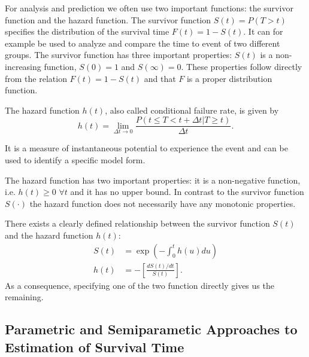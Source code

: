 \documentclass[12pt, a4paper]{article}
\theoremstyle{definition}
\theoremstyle{plain}
\numberwithin{equation}{section}
\numberwithin{figure}{section}
\numberwithin{table}{section}
\begin{document}
	
	For analysis and prediction we often use two important functions: the survivor function and the hazard function.
	The survivor function $S(t) = P(T > t)$ specifies the distribution of the survival time $F(t) = 1 - S(t)$.
	It can for example be used to analyze and compare the time to event of two different groups.
	The survivor function has three important properties: $S(t)$ is a non-increasing function, $S(0)=1$ and $S(\infty)=0$.
	These properties follow directly from the relation $F(t)=1-S(t)$ and that $F$ is a proper distribution function.
	
	The hazard function $h(t)$, also called conditional failure rate, is given by
	\begin{equation*}
		h(t) = \lim_{\Delta t \to 0}\frac{P(t \leq T < t + \Delta t \vert T \geq t)}{\Delta t}.
	\end{equation*} 
	
	It is a measure of instantaneous potential to experience the event and can be used to identify a specific model form.
	
	The hazard function has two important properties: it is a non-negative function, i.e. $h(t) \geq 0$ $ \forall t$ and it has no upper bound.
	In contrast to the survivor function $S(\cdot)$ the hazard function does not necessarily have any monotonic properties.

	There exists a clearly defined relationship between the survivor function $S(t)$ and the hazard function $h(t)$:
	\begin{equation*}
	\begin{split}
		S(t) &= \exp \left( - \int_{0}^{t}h(u)du\right) \\
		h(t) & = - \left[ \frac{dS(t)/dt}{S(t)}\right].
	\end{split}
	\end{equation*}
	As a consequence, specifying one of the two function directly gives us the remaining.
	
	
	
	\subsection{Parametric and Semiparametic Approaches to Estimation of Survival Time} \label{cox}
\end{document}
